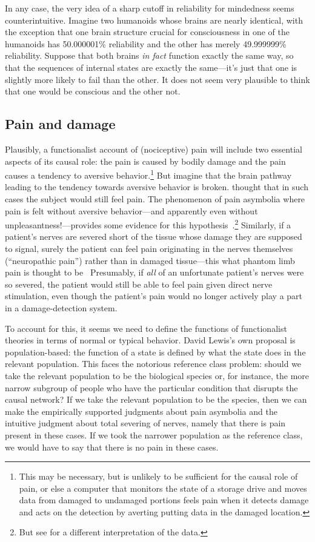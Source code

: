 In any case, the very idea of a sharp cutoff in reliability for mindedness seems counterintuitive. Imagine two humanoids whose 
brains are nearly identical, with the exception that one brain structure crucial for consciousness in one of the humanoids has 
50.000001\% reliability and the other has merely 49.999999\% reliability. Suppose that both brains \textit{in fact}
function exactly the same way, so that the sequences of internal states are exactly the same---it's just that one is slightly
more likely to fail than the other. It does not seem very plausible to think that one would be conscious and the other not.

\subsection{Pain and damage}
Plausibly, a functionalist account of (nociceptive) pain will include two essential aspects of its causal role: 
the pain is caused by bodily damage and the pain causes a tendency to aversive behavior.\footnote{This may be necessary, but is 
unlikely to be sufficient for the causal role of pain, or else a computer that monitors the state of a storage drive and 
moves data from damaged to undamaged portions feels pain when it detects damage and acts on the detection by averting 
putting data in the damaged location.} But imagine that the brain pathway leading to the tendency towards aversive behavior 
is broken.  thought that in such cases the subject would still feel pain. The phenomenon of pain asymbolia
where pain is felt without aversive behavior---and apparently even without unpleasantness!---provides some evidence 
for this hypothesis~\parencite{Grahek}.\footnote{But see  for a different interpretation of the
data.} Similarly, if a patient's nerves are severed short of the tissue whose damage they are 
supposed to signal, surely the patient can feel pain originating in the nerves themselves (``neuropathic pain'') rather 
than in damaged tissue---this what phantom limb pain is thought to be~\parencite{Subedi}
 Presumably, if \textit{all} of an unfortunate
patient's nerves were so severed, the patient would still be able to feel pain given direct nerve stimulation,
even though the patient's pain would no longer actively play a part in a damage-detection system.

To account for this, it seems we need to define the functions of functionalist theories in terms of normal or typical 
behavior. David Lewis's own proposal is population-based: the function of a state is defined by what the state does in the 
relevant population. This faces the notorious reference class problem: should we take the relevant population to be 
the biological species or, for instance, the more narrow subgroup of people who have the particular condition that disrupts the causal 
network? If we take the relevant population to be the species, then we can make the empirically supported judgments about 
pain asymbolia and the intuitive judgment about total severing of nerves, namely that there is pain present in these cases.
If we took the narrower population as the reference class, we would have to say that there is no pain in these cases. 

